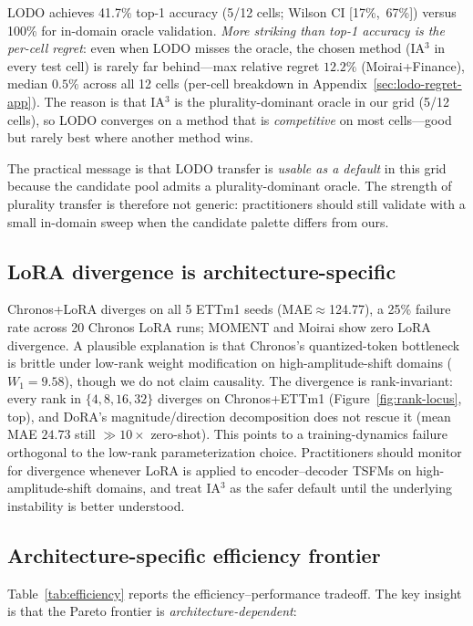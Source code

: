 \documentclass{article}
\begin{document}
LODO achieves 41.7\% top-1 accuracy (5/12 cells; Wilson CI [17\%,~67\%]) versus 100\% for in-domain oracle validation. \emph{More striking than top-1 accuracy is the per-cell regret}: even when LODO misses the oracle, the chosen method (IA$^3$ in every test cell) is rarely far behind---max relative regret $12.2\%$ (Moirai+Finance), median $0.5\%$ across all 12 cells (per-cell breakdown in Appendix~\ref{sec:lodo-regret-app}). The reason is that IA$^3$ is the plurality-dominant oracle in our grid (5/12 cells), so LODO converges on a method that is \emph{competitive} on most cells---good but rarely best where another method wins.

The practical message is that LODO transfer is \emph{usable as a default} in this grid because the candidate pool admits a plurality-dominant oracle. The strength of plurality transfer is therefore not generic: practitioners should still validate with a small in-domain sweep when the candidate palette differs from ours.

\subsection{LoRA divergence is architecture-specific}
\label{sec:divergence}

Chronos+LoRA diverges on all 5 ETTm1 seeds (MAE$\approx$124.77), a 25\% failure rate across 20 Chronos LoRA runs; MOMENT and Moirai show zero LoRA divergence. A plausible explanation is that Chronos's quantized-token bottleneck is brittle under low-rank weight modification on high-amplitude-shift domains ($W_1 = 9.58$), though we do not claim causality. The divergence is rank-invariant: every rank in $\{4, 8, 16, 32\}$ diverges on Chronos+ETTm1 (Figure~\ref{fig:rank-locus}, top), and DoRA's magnitude/direction decomposition does not rescue it (mean MAE $24.73$ still ${\gg}10\times$ zero-shot). This points to a training-dynamics failure orthogonal to the low-rank parameterization choice. Practitioners should monitor for divergence whenever LoRA is applied to encoder--decoder TSFMs on high-amplitude-shift domains, and treat IA$^3$ as the safer default until the underlying instability is better understood.

\subsection{Architecture-specific efficiency frontier}
\label{sec:efficiency}

Table~\ref{tab:efficiency} reports the efficiency--performance tradeoff. The key insight is that the Pareto frontier is \emph{architecture-dependent}:
\end{document}
